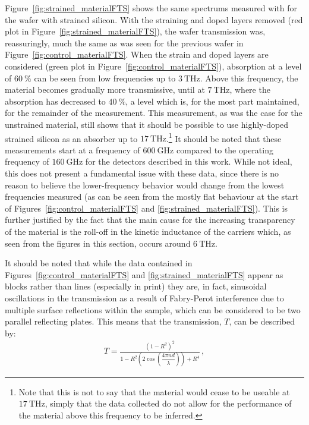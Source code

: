 Figure~\ref{fig:strained_materialFTS} shows the same spectrums measured with for the wafer with strained silicon. With the straining and doped layers removed (red plot in Figure~\ref{fig:strained_materialFTS}), the wafer transmission was, reassuringly, much the same as was seen for the previous wafer in Figure~\ref{fig:control_materialFTS}. When the strain and doped layers are considered (green plot in Figure~\ref{fig:control_materialFTS}), absorption at a level of $60~\%$ can be seen from low frequencies up to $3~\mathrm{THz}$. Above this frequency, the material becomes gradually more transmissive, until at $7~\mathrm{THz}$, where the absorption has decreased to $40~\%$, a level which is, for the most part maintained, for the remainder of the measurement. This measurement, as was the case for the unstrained material, still shows that it should be possible to use highly-doped strained silicon as an absorber up to $17~\mathrm{THz}$.\footnote{Note that this is not to say that the material would cease to be useable at $17~\mathrm{THz}$, simply that the data collected do not allow for the performance of the material above this frequency to be inferred.} It should be noted that these measurements start at a frequency of $600~\mathrm{GHz}$ compared to the operating frequency of $160~\mathrm{GHz}$ for the detectors described in this work. While not ideal, this does not present a fundamental issue with these data, since there is no reason to believe the lower-frequency behavior would change from the lowest frequencies measured (as can be seen from the mostly flat behaviour at the start of Figures~\ref{fig:control_materialFTS} and \ref{fig:strained_materialFTS}). This is further justified by the fact that the main cause for the increasing transparency of the material is the roll-off in the kinetic inductance of the carriers which, as seen from the figures in this section, occurs around $6~\mathrm{THz}$.
\par 
It should be noted that while the data contained in Figures~\ref{fig:control_materialFTS} and \ref{fig:strained_materialFTS} appear as blocks rather than lines (especially in print) they are, in fact, sinusoidal oscillations in the transmission as a result of Fabry-Perot interference due to multiple surface reflections within the sample, which can be considered to be two parallel reflecting plates. This means that the transmission, $T$, can be described by:
\begin{align}
T = \frac{\left(1-R^{2}\right)^{2}}
	{1-R^{2}\left(2\cos\left(\dfrac{4\pi nd}{\lambda}\right)\right)+R^{4}}\,,
\label{eqn:FPinterference}
\end{align}
